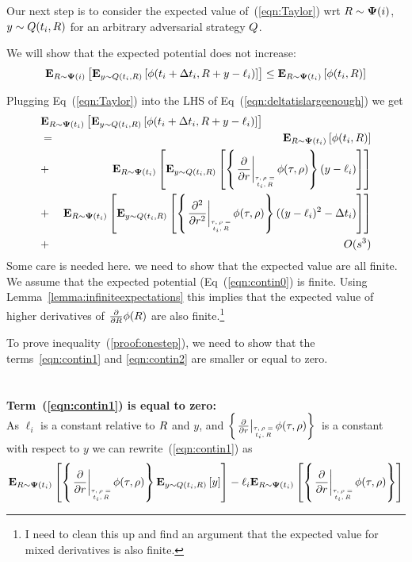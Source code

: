 \documentclass{article}[12pt]
\begin{document}
Our next step is to consider the expected value of~(\ref{eqn:Taylor}) wrt $R \sim {\bf \Psi}(i)$,
$y \sim Q(t_i,R)$ for an arbitrary adversarial strategy
$Q$.

We will show that the expected potential does not increase:
\begin{equation} \label{eqn:deltatislargeenough}
     {\bf E}_{R \sim {\bf \Psi}(i)}\left[  {\bf E}_{y \sim Q(t_i,R)}\left[ \phi(t_i+\Delta t_i,R+y-\ell_i) \right] \right] \leq {\bf E}_{R \sim {\bf \Psi}(t_i)}\left[ \phi(t_i,R) \right]
\end{equation}

Plugging Eq~(\ref{eqn:Taylor}) into the LHS of
Eq~(\ref{eqn:deltatislargeenough}) we get
\begin{eqnarray}
  \lefteqn{\E{\R \sim \state(t_i)}{\E{y \sim \adversM(t_i,\R)}{\pot(t_i+\deltat_i,\R+y-\ell_i)}}} \\
  &=& \E{\R \sim \state(t_i)}{\pot(t_i,\R)} \label{eqn:contin0}\\
  &+& \E{\R \sim \state(t_i)}{\E{y \sim \adversM(t_i,\R)}{\at{\frac{\partial}{\partial r}} (y-\ell_i)}} \label{eqn:contin1}\\
  &+& \E{\R \sim \state(t_i)}{\E{y \sim
      \adversM(t_i,\R)}{\at{\frac{\partial^2}{\partial r^2}}
      ((y-\ell_i)^2 - \deltat_i)}}
  \label{eqn:contin2}\\
  &+& O(s^3) \label{eqn:contin3}
\end{eqnarray}
Some care is needed here. we need to show that the expected value
are all finite. We assume that the expected potential
(Eq~(\ref{eqn:contin0}) is finite. Using
Lemma~\ref{lemma:infiniteexpectations} this implies that the expected
value of higher derivatives of $\frac{\partial}{\partial R} \phi(R)$
are also finite.\footnote{I need to clean this up and find an argument
  that the expected value for mixed derivatives is also finite.}


To prove inequality~(\ref{proof:onestep}), we need to show that the
terms~\ref{eqn:contin1} and \ref{eqn:contin2} are smaller or equal to
zero.
~\\~\\~\\
{\bf Term~(\ref{eqn:contin1}) is equal to zero:}\\
As $\ell_i$ is a constant
relative to $R$ and $y$, and $\at{\frac{\partial}{\partial r}}{}$ is a
constant with respect to $y$ we can rewrite~(\ref{eqn:contin1}) as
\begin{equation} \label{eqnterm1.1}
  \E{\R \sim \state(t_i)}{\at{\frac{\partial}{\partial r}}
    \E{y \sim \adversM(t_i,\R)}{y} }
- \ell_i \E{\R \sim \state(t_i)}{\at{\frac{\partial}{\partial r}}}
\end{equation}
\end{document}

